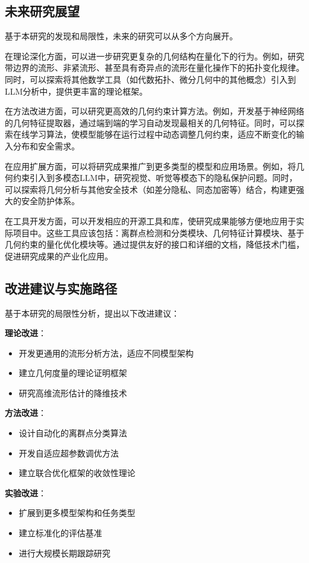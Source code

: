 \subsection{未来研究展望}

基于本研究的发现和局限性，未来的研究可以从多个方向展开。

在理论深化方面，可以进一步研究更复杂的几何结构在量化下的行为。例如，研究带边界的流形、非紧流形、甚至具有奇异点的流形在量化操作下的拓扑变化规律。同时，可以探索将其他数学工具（如代数拓扑、微分几何中的其他概念）引入到LLM分析中，提供更丰富的理论框架。

在方法改进方面，可以研究更高效的几何约束计算方法。例如，开发基于神经网络的几何特征提取器，通过端到端的学习自动发现最相关的几何特征。同时，可以探索在线学习算法，使模型能够在运行过程中动态调整几何约束，适应不断变化的输入分布和安全需求。

在应用扩展方面，可以将研究成果推广到更多类型的模型和应用场景。例如，将几何约束引入到多模态LLM中，研究视觉、听觉等模态下的隐私保护问题。同时，可以探索将几何分析与其他安全技术（如差分隐私、同态加密等）结合，构建更强大的安全防护体系。

在工具开发方面，可以开发相应的开源工具和库，使研究成果能够方便地应用于实际项目中。这些工具应该包括：离群点检测和分类模块、几何特征计算模块、基于几何约束的量化优化模块等。通过提供友好的接口和详细的文档，降低技术门槛，促进研究成果的产业化应用。

\subsection{改进建议与实施路径}

基于本研究的局限性分析，提出以下改进建议：

\textbf{理论改进}：
\begin{itemize}
\item 开发更通用的流形分析方法，适应不同模型架构
\item 建立几何度量的理论证明框架
\item 研究高维流形估计的降维技术
\end{itemize}

\textbf{方法改进}：
\begin{itemize}
\item 设计自动化的离群点分类算法
\item 开发自适应超参数调优方法
\item 建立联合优化框架的收敛性理论
\end{itemize}

\textbf{实验改进}：
\begin{itemize}
\item 扩展到更多模型架构和任务类型
\item 建立标准化的评估基准
\item 进行大规模长期跟踪研究
\end{itemize}

